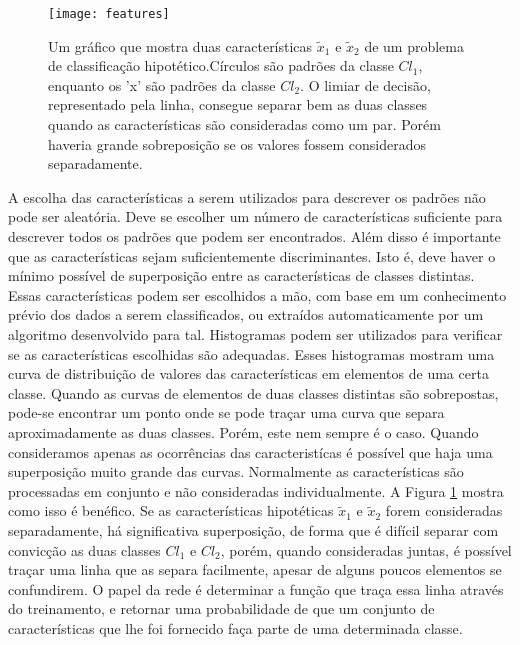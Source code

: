 \begin{figure}[!ht]
\centering
\texttt{[image: features]}
\caption[Um gráfico que mostra duas características $\tilde{x}_1$ e $\tilde{x}_2$ de um problema de classificação hipotético.]{Um gráfico que mostra duas características $\tilde{x}_1$ e $\tilde{x}_2$ de um problema de classificação hipotético.\protect\footnotemark  Círculos são padrões da classe $Cl_1$, enquanto os 'x' são padrões da classe $Cl_2$. O limiar de decisão, representado pela linha, consegue separar bem as duas classes quando as características são consideradas como um par. Porém haveria grande sobreposição se os valores fossem considerados separadamente.}
\label{fig:features}
\centering
\end{figure}
A escolha das características a serem utilizados para descrever os padrões não pode ser aleatória. Deve se escolher um número de características suficiente para descrever todos os padrões que podem ser encontrados. Além disso é importante que as características sejam suficientemente discriminantes. Isto é, deve haver o mínimo possível de superposição entre as características de classes distintas. Essas características podem ser escolhidos a mão, com base em um conhecimento prévio dos dados a serem classificados, ou extraídos automaticamente por um algoritmo desenvolvido para tal. Histogramas podem ser utilizados para verificar se as características escolhidas são adequadas. Esses histogramas mostram uma curva de distribuição de valores das características em elementos de uma certa classe. Quando as curvas de elementos de duas classes distintas são sobrepostas, pode-se encontrar um ponto onde se pode traçar uma curva que separa aproximadamente as duas classes. Porém, este nem sempre é o caso. Quando consideramos apenas as ocorrências das caracteristícas é possível que haja uma superposição muito grande das curvas. Normalmente as características são processadas em conjunto e não consideradas individualmente. A Figura \ref{fig:features} mostra como isso é benéfico. Se as características hipotéticas $\tilde{x}_1$ e $\tilde{x}_2$ forem consideradas separadamente, há significativa superposição, de forma que é difícil separar com convicção as duas classes $Cl_1$ e $Cl_2$, porém, quando consideradas juntas, é possível traçar uma linha que as separa facilmente, apesar de alguns poucos elementos se confundirem. O papel da rede é determinar a função que traça essa linha através do treinamento, e retornar uma probabilidade de que um conjunto de características que lhe foi fornecido faça parte de uma determinada classe.



